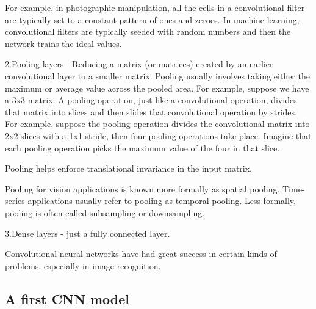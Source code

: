 \documentclass[
]{article}
\begin{document}
For example, in photographic manipulation, all the cells in a
convolutional filter are typically set to a constant pattern of ones and
zeroes. In machine learning, convolutional filters are typically seeded
with random numbers and then the network trains the ideal values.

2.Pooling layers - Reducing a matrix (or matrices) created by an earlier
convolutional layer to a smaller matrix. Pooling usually involves taking
either the maximum or average value across the pooled area. For example,
suppose we have a 3x3 matrix. A pooling operation, just like a
convolutional operation, divides that matrix into slices and then slides
that convolutional operation by strides. For example, suppose the
pooling operation divides the convolutional matrix into 2x2 slices with
a 1x1 stride, then four pooling operations take place. Imagine that each
pooling operation picks the maximum value of the four in that slice.

Pooling helps enforce translational invariance in the input matrix.

Pooling for vision applications is known more formally as spatial
pooling. Time-series applications usually refer to pooling as temporal
pooling. Less formally, pooling is often called subsampling or
downsampling.

3.Dense layers - just a fully connected layer.

Convolutional neural networks have had great success in certain kinds of
problems, especially in image recognition.

\hypertarget{a-first-cnn-model}{%
\subsection{A first CNN model}\label{a-first-cnn-model}}
\end{document}
